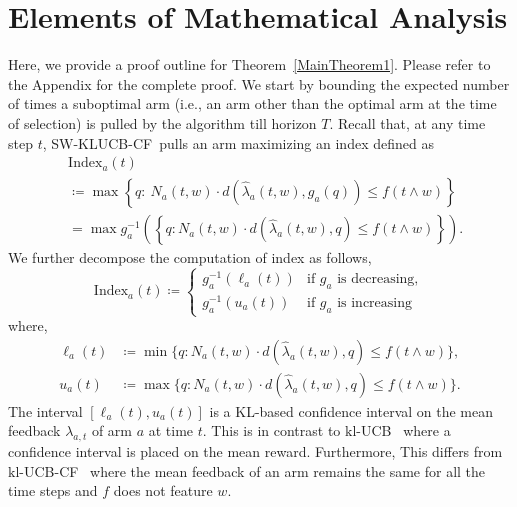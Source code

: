 \documentclass[letterpaper]{article} %
\newcommand{\defined}{\coloneqq}
\newcommand{\KLUCBCF}{$\mathrm{kl}$-\textsc{UCB-CF}}
\newcommand{\SWKLUCBCF}{\textsc{SW-KLUCB-CF}}
\newcommand{\KLUCB}{$\mathrm{kl}$-\textsc{UCB}}
\newcommand{\meanFeedback}[2]{\lambda_{#1, #2}}
\newcommand{\windowsize}{w}
\begin{document}
\section{Elements of Mathematical Analysis}
Here, we provide a proof outline for Theorem~\ref{MainTheorem1}. Please refer to the Appendix for the complete proof.  We start by bounding the expected number of times a suboptimal arm (i.e., an arm other than the optimal arm at the time of selection) is pulled by the algorithm till horizon $T$. Recall that, at any time step $t$, \SWKLUCBCF \ pulls an arm maximizing an index defined as
\begin{align*}
& \mathrm{Index}_a(t) \\
&\defined \max \left\{ q:\  N_a(t, \windowsize)\cdot{}d\left(\hat{\lambda}_a(t, \windowsize), g_a(q)\right) \leq f\left(t \wedge \windowsize\right) \right\} \\
&= \max g_a^{-1}\left( \left\{q: N_a(t, \windowsize)\cdot{}d\left(\hat{\lambda}_a(t, \windowsize), q\right) \leq f\left(t \wedge \windowsize\right)\right\} \right).
\end{align*}
We further decompose the computation of index as follows,
$$\mathrm{Index}_a(t) \defined
\begin{cases}
g_a^{-1}({\ell_a(t)}) & \text{if } g_a \text{ is decreasing}, \\
g_a^{-1}({u_a(t)}) & \text{if } g_a \text{ is increasing}
\end{cases}  $$
where,
\begin{align*}
\ell_a(t)  &\defined  \min \Big\{q: N_a(t, \windowsize)\cdot{}d\left(\hat{\lambda}_a(t, \windowsize), q\right) \leq f\left( t \wedge \windowsize \right)\Big\}, \\
u_a(t)  &\defined  \max \Big\{q: N_a(t, \windowsize)\cdot{}d\left(\hat{\lambda}_a(t, \windowsize), q\right) \leq f\left( t \wedge\windowsize \right) \Big\}.
\end{align*}  The interval $[\ell_a(t), u_a(t)]$ is a KL-based confidence interval on the mean feedback $\meanFeedback{a}{t}$ of arm $a$ at time $t$.
This is in contrast to \KLUCB\ \citep{KLUCBJournal} where a confidence interval is placed on the mean reward. Furthermore,
This differs from \KLUCBCF \ \cite{pmlr-v83-gajane18a} where the mean feedback of an arm remains the same for all the time steps and $f$ does not feature $\windowsize$.
\end{document}
